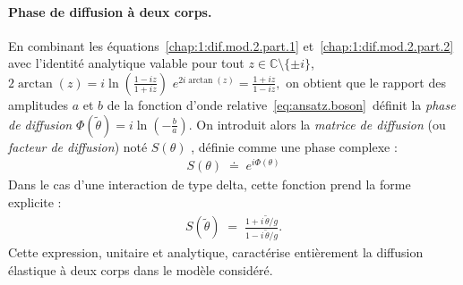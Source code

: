 

\paragraph{Phase de diffusion à deux corps.}

En combinant les équations~\eqref{chap:1:dif.mod.2.part.1} et~\eqref{chap:1:dif.mod.2.part.2} avec l’identité analytique valable pour tout
\(z \in \mathbb{C}\setminus\{\pm i\}\),
\(
2\arctan(z)=i\ln\!\left(\frac{1-iz}{1+iz}\right)
\)
\ie 
\(
e^{2i\arctan(z)}=\frac{1+iz}{1-iz},
\)
on obtient que le rapport des amplitudes \(a\) et \(b\) de la fonction
d’onde relative~\eqref{eq:ansatz.boson} définit la {\em phase de diffusion }
\(
\Phi(\tilde{\theta}) = i\ln\!\left(-\frac{b}{a}\right).
\)
On introduit alors la {\em matrice de diffusion} (ou {\em facteur de diffusion}) noté  \(S(\theta) \) , définie comme une phase complexe : 
\begin{eqnarray}\label{chap:1:def.mat.dif.1}
	S(\theta) \;\doteq\; e^{i\Phi(\theta)}	
\end{eqnarray}
Dans le cas d’une interaction de type delta, cette fonction prend la forme explicite :
\begin{eqnarray}\label{chap:1:dif.mod.2.part.3}
	S(\tilde{\theta}) \; = \; \frac{1 + i\,\tilde{\theta}/g}{1 - i\,\tilde{\theta}/g}.%
\end{eqnarray}
Cette expression, unitaire et analytique, caractérise entièrement la diffusion élastique à deux corps dans le modèle considéré.



